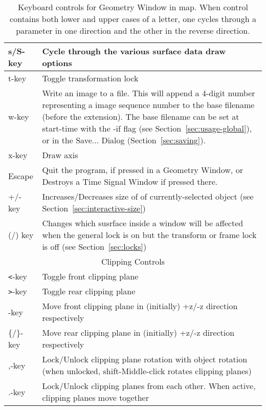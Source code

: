 \begin{table}[htbp]
\begin{center}
\begin{tabular}{|l|p{6in}|}
        s/S-key   &      Cycle through the various surface data draw 
        options \\ \hline
        t-key   &       Toggle transformation lock \\ \hline
        w-key   &       Write an image to a file.  This will append a 4-digit 
                        number representing a image sequence number to the 
                        base filename (before the extension).  The base 
                        filename can be set at start-time with the -if flag 
                        (see Section~\ref{sec:usage-global}), or in the 
                        Save... Dialog (Section~\ref{sec:saving}).  \\ \hline
        x-key   &       Draw axis \\ \hline
        Escape  &       Quit the program, if pressed in a Geometry Window, 
            or Destroys a Time Signal Window if pressed there. \\ \hline
        +/- key   &    Increases/Decreases size of of currently-selected object
       (see Section~\ref{sec:interactive-size})\\ \hline
      (/) key   &       Changes which susrface inside a window will be affected
          when the general lock is on but the transform or frame lock is off
           (see Section~\ref{sec:locks})\\ \hline
        \multicolumn{2}{|c|}{Clipping Controls} \\ \hline
        \verb|<|-key    &       Toggle front clipping plane \\ \hline
        \verb|>|-key   &       Toggle rear clipping plane \\ \hline
        [/]-key   &     Move front clipping plane in (initially) +z/-z
        direction respectively \\ \hline
        \{/\}-key   &   Move rear clipping plane in (initially) +z/-z
        direction respectively \\ \hline
        ,-key   &       Lock/Unlock clipping plane rotation with object
        rotation (when unlocked, shift-Middle-click rotates clipping
        planes) \\ \hline
        .-key   &       Lock/Unlock clipping planes from each other.
        When active, clipping planes move together \\ \hline
\end{tabular}
\end{center}
\caption{\label{table:keys} Keyboard controls for Geometry Window in map{}.
  When control 
  contains both lower and upper cases of a letter, one cycles through a
  parameter in one direction and the other in the reverse direction.}

\end{table} 

